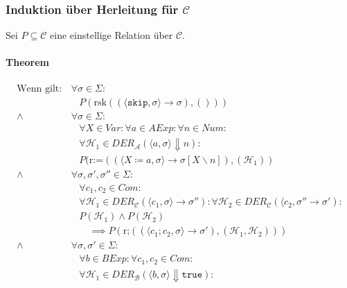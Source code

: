 		    
		    \subsubsection{Induktion über Herleitung für $ \mathcal{C} $}
			    Sei $ P \subseteq \mathcal{C} $ eine einstellige Relation über $ \mathcal{C} $.
			    
			    \paragraph{Theorem}
				    \begin{align*}
					    \text{Wenn gilt:} & \,\forall \sigma \in \Sigma : \\
						    &\quad P(\text{rsk}((\langle \texttt{skip}, \sigma \rangle \rightarrow \sigma), ())) \\
					    \land & \,\forall \sigma \in \Sigma : \\
						    &\quad \forall X \in \textit{Var} : \forall a \in \textit{AExp} : \forall n \in \textit{Num} : \\
						    &\quad \forall \mathcal{H} _ 1 \in \textit{DER} _ \mathcal{A} (\langle a, \sigma \rangle \Downarrow n) : \\
						    &\quad P(\text{r:=}((\langle X \coloneqq a, \sigma \rangle \rightarrow \sigma[X \backslash n]), (\mathcal{H} _ 1)) \\
					    \land & \,\forall \sigma, \sigma', \sigma'' \in \Sigma : \\
						    &\quad \forall c _ 1, c _ 2 \in \textit{Com} : \\
						    &\quad \forall \mathcal{H} _ 1 \in \textit{DER} _ \mathcal{C} (\langle c _ 1, \sigma \rangle \rightarrow \sigma'') : \forall \mathcal{H} _ 2 \in \textit{DER} _ \mathcal{C} (\langle c _ 2, \sigma'' \rightarrow \sigma') : \\
						    &\quad P(\mathcal{H} _ 1) \land P(\mathcal{H} _ 2) \\
						    &\quad\quad \implies P(\text{r;}((\langle c _ 1 ; c _ 2, \sigma \rangle \rightarrow \sigma'), (\mathcal{H} _ 1, \mathcal{H} _ 2))) \\
					    \land & \,\forall \sigma, \sigma' \in \Sigma : \\
						    &\quad \forall b \in \textit{BExp} : \forall c _ 1, c _ 2 \in \textit{Com} : \\
						    &\quad \forall \mathcal{H} _ 1 \in \textit{DER} _ \mathcal{B} (\langle b, \sigma \rangle \Downarrow \texttt{true}) : \\

\end{align*}
